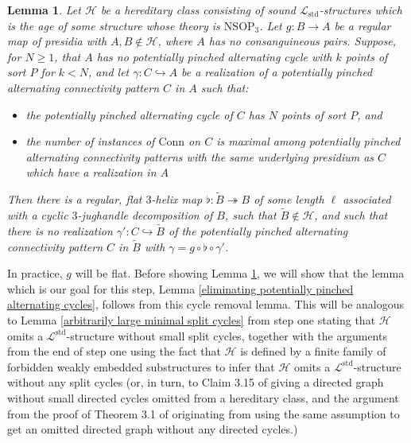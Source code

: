 \documentclass{amsart}
\newtheorem{lemma}[theorem]{Lemma}
\theoremstyle{definition}
\theoremstyle{remark}
\numberwithin{equation}{section}
\begin{document}
\begin{lemma}
    \label{potentially pinched alternating cycle removal} Let $\mathcal{H}$ be a hereditary class consisting of sound $\mathcal{L}_{\mathrm{std}}$-structures which is the age of some structure whose theory is $\mathrm{NSOP}_{3}$. Let $g: B \to A$ be a regular map of presidia with $A, B\notin \mathcal{H}$, where $A$ has no consanguineous pairs. Suppose, for $N \geq 1$, that $A$ has no potentially pinched alternating cycle with $k$ points of sort $P$ for $k < N$, and let $\gamma: C \hookrightarrow A$ be a realization of a potentially pinched alternating connectivity pattern $C$ in $A$ such that:

\begin{itemize}
    \item the potentially pinched alternating cycle of $C$ has $N$ points of sort $P$, and
    \item the number of instances of $\mathrm{Conn}$ on $C$ is maximal among potentially pinched alternating connectivity patterns with the same underlying presidium as $C$ which have a realization in $A$
\end{itemize}
    

    
    
    Then there is a regular, flat $3$-helix map $\flat: \tilde{B} \twoheadrightarrow B$ of some length $\ell$ associated with a cyclic $3$-jughandle decomposition of $B$, such that $\tilde{B} \notin \mathcal{H}$, and such that there is no realization  $\gamma': C \hookrightarrow \tilde{B}$ of the potentially pinched alternating connectivity pattern $C$ in $\tilde{B}$ with $\gamma = g\circ \flat\circ \gamma'$.



\end{lemma}






In practice, $g$ will be flat. Before showing Lemma \ref{potentially pinched alternating cycle removal}, we will show that the lemma which is our goal for this step, Lemma \ref{eliminating potentially pinched alternating cycles}, follows from this cycle removal lemma. This will be analogous to Lemma \ref{arbitrarily large minimal split cycles} from step one stating that $\mathcal{H}$ omits a $\mathcal{L}^{\mathrm{std}}$-structure without small split cycles, together with the arguments from the end of step one using the fact that $\mathcal{H}$ is defined by a finite family of forbidden weakly embedded substructures to infer that $\mathcal{H}$ omits a $\mathcal{L}^{\mathrm{std}}$-structure without any split cycles (or, in turn, to Claim 3.15 of \cite{ApproxOrder} giving a directed graph without small directed cycles omitted from a hereditary class, and the argument from the proof of Theorem 3.1 of \cite{ApproxOrder} originating from \cite{LZ17} using the same assumption to get an omitted directed graph without any directed cycles.)
\end{document}
